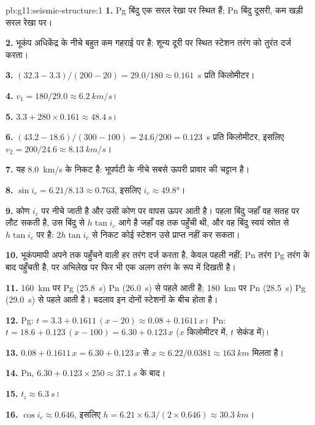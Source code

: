 \begin{solution}{pb:g11:seismic-structure:1}
\textbf{1.} Pg बिंदु एक सरल रेखा पर स्थित हैं; Pn बिंदु
दूसरी, कम खड़ी सरल रेखा पर।

\textbf{2.} भूकंप अधिकेंद्र के नीचे बहुत कम गहराई पर है:
शून्य दूरी पर स्थित स्टेशन तरंग को तुरंत दर्ज करता।

\textbf{3.} $(32.3 - 3.3)/(200 - 20) = 29.0/180 \approx \num{0.161}$~\unit{s}
प्रति किलोमीटर।

\textbf{4.} $v_1 = 180/29.0 \approx \qty{6.2}{km/s}$।

\textbf{5.} $3.3 + 280 \times 0.161 \approx \qty{48.4}{s}$।

\textbf{6.} $(43.2 - 18.6)/(300 - 100) = 24.6/200 = \num{0.123}$~\unit{s}
प्रति किलोमीटर, इसलिए $v_2 = 200/24.6 \approx \qty{8.13}{km/s}$।

\textbf{7.} यह \qty{8.0}{km/s} के निकट है: भूपर्पटी के नीचे सबसे ऊपरी
प्रावार की चट्टान है।

\textbf{8.} $\sin i_c = 6.21/8.13 \approx 0.763$, इसलिए $i_c \approx
\ang{49.8}$।

\textbf{9.}  कोण $i_c$ पर नीचे जाती है और उसी कोण पर वापस
ऊपर आती है। पहला बिंदु जहाँ वह सतह पर लौट सकती है, उस बिंदु से
$h\tan i_c$ आगे है जहाँ वह  तक पहुँची थी, और वह बिंदु स्वयं स्रोत से $h\tan i_c$
पर है: $2h\tan i_c$ से निकट कोई स्टेशन उसे प्राप्त नहीं कर सकता।

\textbf{10.} भूकंपमापी अपने तक पहुँचने वाली हर तरंग दर्ज करता है, केवल
पहली नहीं; Pn तरंग Pg तरंग के बाद पहुँचती है, पर अभिलेख पर फिर भी एक अलग
तरंग के रूप में दिखती है।

\textbf{11.} \qty{160}{km} पर Pg (\qty{25.8}{s}) Pn
(\qty{26.0}{s}) से पहले आती है; \qty{180}{km} पर Pn (\qty{28.5}{s}) Pg
(\qty{29.0}{s}) से पहले आती है। बदलाव इन दोनों स्टेशनों के बीच होता है।

\textbf{12.} Pg: $t = 3.3 + 0.1611\,(x - 20) \approx 0.08 + 0.1611\,x$। Pn:
$t = 18.6 + 0.123\,(x - 100) = 6.30 + 0.123\,x$ ($x$ किलोमीटर में, $t$
सेकंड में)।

\textbf{13.} $0.08 + 0.1611\,x = 6.30 + 0.123\,x$ से $x \approx
6.22/0.0381 \approx \qty{163}{km}$ मिलता है।

\textbf{14.} Pn, $6.30 + 0.123 \times 250 \approx \qty{37.1}{s}$ के बाद।

\textbf{15.} $t_i \approx \qty{6.3}{s}$।

\textbf{16.} $\cos i_c \approx 0.646$, इसलिए $h = 6.21 \times 6.3/(2 \times
0.646) \approx \qty{30.3}{km}$।


\end{solution}

